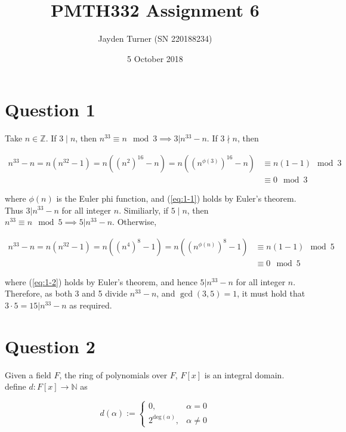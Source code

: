 \documentclass{article}
\title{PMTH332 Assignment 6}
\date{5 October 2018}
\author{Jayden Turner (SN 220188234)}
\begin{document}
\maketitle
{}

\section*{Question 1}

\hfill \break
Take $n \in \mathbb{Z}$. If $3 \mid n$, then $n^{33} \equiv n\mod3
\implies 3 | n^{33} - n$. If $3 \nmid n$, then

\begin{align}
    n^{33} - n = n(n^{32} - 1) = n((n^2)^{16} - n)
        = n((n^{\phi(3)})^{16} - n) &\equiv n(1 - 1)\mod3 \label{eq:1-1}\\
    &\equiv 0\mod3\nonumber
\end{align}

where $\phi(n)$ is the Euler phi function, and (\ref{eq:1-1}) holds
by Euler's theorem. Thus $3 | n^{33} - n$ for all integer $n$.
Similiarly, if $5 \mid n$, then $n^{33} \equiv n\mod5 \implies 5 | n^{33} - n$.
Otherwise,

\begin{align}
    n^{33} - n = n(n^{32} - 1) = n((n^4)^8 - 1)
        = n((n^{\phi(n)})^8 - 1) &\equiv n(1 - 1)\mod5 \label{eq:1-2}\\
    &\equiv 0\mod5\nonumber
\end{align}

where (\ref{eq:1-2}) holds by Euler's theorem, and hence $5 | n^{33} - n$ for
all integer $n$. Therefore, as both 3 and 5 divide $n^{33} - n$, and $\gcd(3, 5) = 1$,
it must hold that $3\cdot5 = 15 | n^{33} - n$ as required.

\section*{Question 2}

Given a field $F$, the ring of polynomials over $F$, $F[x]$ is an integral
domain. define $d: F[x] \to \mathbb{N}$ as

\begin{equation}
    d(\alpha) := \begin{cases}
        0, & \alpha = 0\\
        2^{\text{deg}(\alpha)}, & \alpha \neq 0
    \end{cases}
\end{equation}
\end{document}
